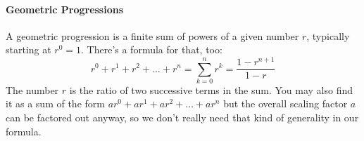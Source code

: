 







\paragraph{Geometric Progressions}
A geometric progression is a finite sum of powers of a given number $r$, typically starting at $r^0 = 1$. There's a formula for that, too:
\begin{equation}
 r^0 + r^1 + r^2 + \ldots + r^n = \sum_{k=0}^{n} r^k = \frac{1-r^{n+1}}{1 - r}
\end{equation}
The number $r$ is the ratio of two successive terms in the sum. You may also find it as a sum of the form $a r^0 + a r^1 + a r^2 + \ldots + a r^n$ but the overall scaling factor $a$ can be factored out anyway, so we don't really need that kind of generality in our formula.



